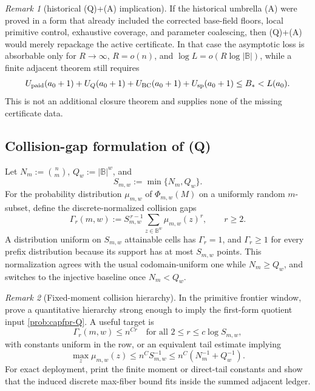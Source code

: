 \documentclass[11pt]{article}
\theoremstyle{definition}
\theoremstyle{remark}
\newtheorem{remark}[remark]{Remark}
\newcommand{\B}{\mathbb{B}}
\begin{document}
\begin{remark}[historical \textup{(Q)}+\textup{(A)} implication]\label{prop:capfpr-AQ-closing}
If the historical umbrella \textup{(A)} were proved in a form that already included the corrected base-field floors, local primitive control, exhaustive coverage, and parameter coalescing, then \textup{(Q)}+\textup{(A)} would merely repackage the active certificate.  In that case the asymptotic loss is absorbable only for $R\to\infty$, $R=o(n)$, and $\log L=o(R\log|\B|)$, while a finite adjacent theorem still requires
\[
U_{\rm paid}(a_0+1)+U_Q(a_0+1)+U_{\rm BC}(a_0+1)+U_{\rm sp}(a_0+1)
\le B_*<L(a_0).
\]
This is not an additional closure theorem and supplies none of the missing certificate data.
\end{remark}

\subsection{Collision-gap formulation of \textup{(Q)}}\label{subsec:capfpr-collision-gap}

Let $N_{m}:=\binom nm$, $Q_w:=|\B|^w$, and
\[
        S_{m,w}:=\min\{N_m,Q_w\}.
\]
For the probability distribution $\mu_{m,w}$ of $\Phi_{m,w}(M)$ on a uniformly
random $m$-subset, define the discrete-normalized collision gaps
\[
        \Gamma_r(m,w)
        := S_{m,w}^{\,r-1}\sum_{z\in\B^w}\mu_{m,w}(z)^r,
        \qquad r\ge2.
\]
A distribution uniform on $S_{m,w}$ attainable cells has $\Gamma_r=1$, and
$\Gamma_r\ge1$ for every prefix distribution because its support has at most
$S_{m,w}$ points.  This normalization agrees with the usual codomain-uniform
one while $N_m\ge Q_w$, and switches to the injective baseline once $N_m<Q_w$.

\begin{remark}[Fixed-moment collision hierarchy]\label{prob:capfpr-collision-gap}
In the primitive frontier window, prove a quantitative hierarchy strong enough
to imply the first-form quotient input \cref{prob:capfpr-Q}.  A useful target is
\[
        \Gamma_r(m,w)\le n^{Cr}
        \quad\text{for all }2\le r\le c\log S_{m,w},
\]
with constants uniform in the row, or an equivalent tail estimate implying
\[
        \max_z\mu_{m,w}(z)
        \le n^C S_{m,w}^{-1}
        \le n^C\left(N_m^{-1}+Q_w^{-1}\right).
\]
For exact deployment, print the finite moment or direct-tail constants and show
that the induced discrete max-fiber bound fits inside the summed adjacent
ledger.
\end{remark}
\end{document}
